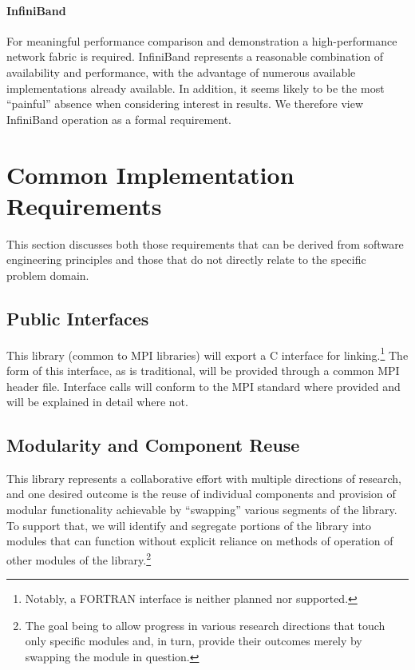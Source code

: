\documentclass{article}
\begin{document}
\paragraph{InfiniBand}  For meaningful performance comparison and demonstration a high-performance network fabric is required.  InfiniBand represents a reasonable combination of availability and performance, with the advantage of numerous available implementations already available.  In addition, it seems likely to be the most ``painful'' absence when considering interest in results.  We therefore view InfiniBand operation as a formal requirement.

\section{Common Implementation Requirements}

This section discusses both those requirements that can be derived from software engineering principles and those that do not directly relate to the specific problem domain.

\subsection{Public Interfaces}

This library (common to MPI libraries) will export a C interface for linking.\footnote{Notably, a FORTRAN interface is neither planned nor supported.}  The form of this interface, as is traditional, will be provided through a common MPI header file.  Interface calls will conform to the MPI standard where provided and will be explained in detail where not.

\subsection{Modularity and Component Reuse}

This library represents a collaborative effort with multiple directions of research, and one desired outcome is the reuse of individual components and provision of modular functionality achievable by ``swapping'' various segments of the library.  To support that, we will identify and segregate portions of the library into modules that can function without explicit reliance on methods of operation of other modules of the library.\footnote{The goal being to allow progress in various research directions that touch only specific modules and, in turn, provide their outcomes merely by swapping the module in question.}
\end{document}
